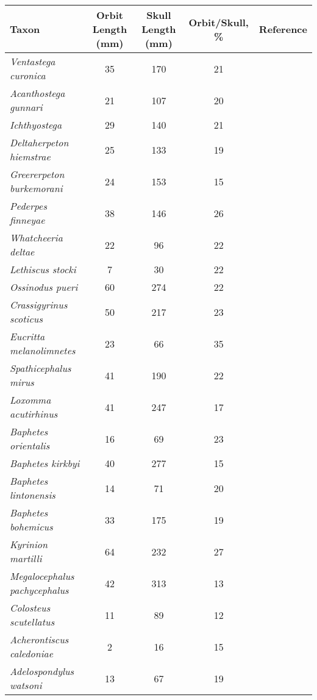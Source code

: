 \begin{tabular}{|L{4.5cm}|c|c|c|L{4.5cm}|}
\hline
\textbf{Taxon}&\textbf{Orbit Length (mm)}&\textbf{Skull Length (mm)}&\textbf{Orbit/Skull, \%}&\textbf{Reference}\\\hline
\textit{Ventastega curonica}&35&170&21&\citet{Ahlb08a}\\\hline
\textit{Acanthostega gunnari}&21&107&20&\citet{Clac02b,Porr15a}\\\hline
\textit{Ichthyostega}&29&140&21&\citet{Bent90a}\\\hline
\textit{Deltaherpeton hiemstrae}&25&133&19&\citet{Bolt10a}\\\hline
\textit{Greererpeton burkemorani}&24&153&15&\citet{Bent90a}\\\hline
\textit{Pederpes finneyae}&38&146&26&\citet{Clac02a}\\\hline
\textit{Whatcheeria deltae}&22&96&22&\citet{Lomb95a}\\\hline
\textit{Lethiscus stocki}&7&30&22&\citet{Well82a}\\\hline
\textit{Ossinodus pueri}&60&274&22&\citet{Warr04a,Warr07a}\\\hline
\textit{Crassigyrinus scoticus}&50&217&23&\citet{Panc85a}\\\hline
\textit{Eucritta melanolimnetes}&23&66&35&\citet{Clac98a}\\\hline
\textit{Spathicephalus mirus}&41&190&22&\citet{Beau98a}\\\hline
\textit{Loxomma acutirhinus}&41&247&17&\citet{Beau77a}\\\hline
\textit{Baphetes orientalis}&16&69&23&\citet{Miln09a}\\\hline
\textit{Baphetes kirkbyi}&40&277&15&\citet{Beau77a}\\\hline
\textit{Baphetes lintonensis}&14&71&20&\citet{Beau77a}\\\hline
\textit{Baphetes bohemicus}&33&175&19&\citet{Beau77a}\\\hline
\textit{Kyrinion martilli}&64&232&27&\citet{Clac03a}\\\hline
\textit{Megalocephalus pachycephalus}&42&313&13&\citet{Beau77a}\\\hline
\textit{Colosteus scutellatus}&11&89&12&\citet{Hook83a}\\\hline
\textit{Acherontiscus caledoniae}&2&16&15&\citet{Carr69a}\\\hline
\textit{Adelospondylus watsoni}&13&67&19&\citet{Carr67a}\\\hline
\end{tabular}
